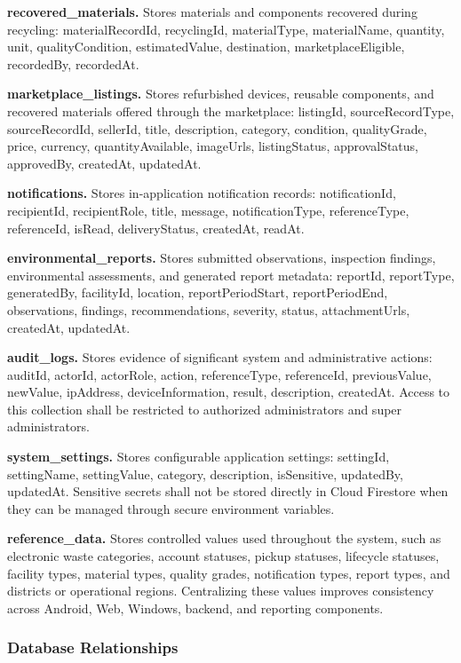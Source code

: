 \textbf{recovered\_materials.} Stores materials and components recovered
during recycling: materialRecordId, recyclingId, materialType, materialName,
quantity, unit, qualityCondition, estimatedValue, destination,
marketplaceEligible, recordedBy, recordedAt.

\textbf{marketplace\_listings.} Stores refurbished devices, reusable
components, and recovered materials offered through the marketplace:
listingId, sourceRecordType, sourceRecordId, sellerId, title, description,
category, condition, qualityGrade, price, currency, quantityAvailable,
imageUrls, listingStatus, approvalStatus, approvedBy, createdAt, updatedAt.

\textbf{notifications.} Stores in-application notification records:
notificationId, recipientId, recipientRole, title, message, notificationType,
referenceType, referenceId, isRead, deliveryStatus, createdAt, readAt.

\textbf{environmental\_reports.} Stores submitted observations, inspection
findings, environmental assessments, and generated report metadata:
reportId, reportType, generatedBy, facilityId, location, reportPeriodStart,
reportPeriodEnd, observations, findings, recommendations, severity, status,
attachmentUrls, createdAt, updatedAt.

\textbf{audit\_logs.} Stores evidence of significant system and
administrative actions: auditId, actorId, actorRole, action, referenceType,
referenceId, previousValue, newValue, ipAddress, deviceInformation, result,
description, createdAt. Access to this collection shall be restricted to
authorized administrators and super administrators.

\textbf{system\_settings.} Stores configurable application settings: settingId,
settingName, settingValue, category, description, isSensitive, updatedBy,
updatedAt. Sensitive secrets shall not be stored directly in Cloud Firestore
when they can be managed through secure environment variables.

\textbf{reference\_data.} Stores controlled values used throughout the
system, such as electronic waste categories, account statuses, pickup statuses,
lifecycle statuses, facility types, material types, quality grades, notification
types, report types, and districts or operational regions. Centralizing these
values improves consistency across Android, Web, Windows, backend, and
reporting components.

\subsubsection{Database Relationships}

